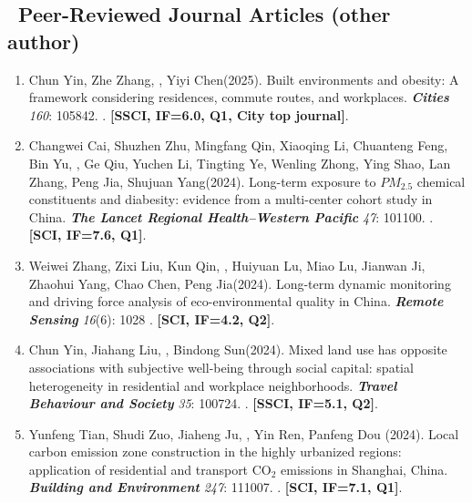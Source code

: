 \subsection*{\texorpdfstring{\faBook\ Peer-Reviewed Journal Articles (other author)}{Other Peer-Reviewed Journal Articles (other author)}}
\begin{enumerate}
\item
    Chun Yin\CS, Zhe Zhang, \Shaoqing, Yiyi Chen\CS (2025).
    Built environments and obesity: A framework considering residences, commute routes, and workplaces.
    \textbf{\textit{Cities}} \textit{160}: 105842.
    . \textbf{[SSCI, IF=6.0, Q1, City top journal]}.
\item
    Changwei Cai\CF, Shuzhen Zhu\CF, Mingfang Qin\CF, Xiaoqing Li\CF, Chuanteng Feng, Bin Yu, \Shaoqing, Ge Qiu, Yuchen Li, Tingting Ye, Wenling Zhong, Ying Shao, Lan Zhang, Peng Jia\CS, Shujuan Yang\CS (2024).
    Long-term exposure to $PM_{2.5}$ chemical constituents and diabesity: evidence from a multi-center cohort study in China. 
    \textbf{\textit{The Lancet Regional Health–Western Pacific}} \textit{47}: 101100.
    . \textbf{[SCI, IF=7.6, Q1]}.
\item
    Weiwei Zhang, Zixi Liu, Kun Qin, \Shaoqing, Huiyuan Lu, Miao Lu, Jianwan Ji, Zhaohui Yang, Chao Chen, Peng Jia\CS (2024).
    Long-term dynamic monitoring and driving force analysis of eco-environmental quality in China. 
    \textbf{\textit{Remote Sensing}} \textit{16}(6): 1028
    . \textbf{[SCI, IF=4.2, Q2]}.
\item
    Chun Yin, Jiahang Liu, \Shaoqing, Bindong Sun\CS (2024).
    Mixed land use has opposite associations with subjective well-being through social capital: spatial heterogeneity in residential and workplace neighborhoods.
    \textbf{\textit{Travel Behaviour and Society}} \textit{35}: 100724.
    . \textbf{[SSCI, IF=5.1, Q2]}.
\item
    Yunfeng Tian, Shudi Zuo\CS, Jiaheng Ju, \Shaoqing, Yin Ren, Panfeng Dou (2024).
    Local carbon emission zone construction in the highly urbanized regions: application of residential and transport CO$_2$ emissions in Shanghai, China.
    \textbf{\textit{Building and Environment}} \textit{247}: 111007.
    . \textbf{[SCI, IF=7.1, Q1]}.

\end{enumerate}

